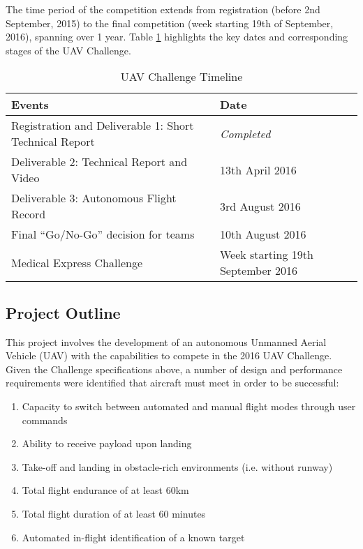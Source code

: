 The time period of the competition extends from registration (before 2nd September, 2015) to the final competition (week starting 19th of September, 2016), spanning over 1 year. Table \ref{tab:challenge} highlights the key dates and corresponding stages of the UAV Challenge.\\

\begin{table}[!ht]
	\caption{UAV Challenge Timeline}
	\label{tab:challenge}
	\centering
	\begin{tabular}{ | l | l | }
		\hline
		\textbf{Events} & \textbf{Date} \\ \hline \hline
		Registration and Deliverable 1: Short Technical Report & \textit{Completed} \\ \hline
		Deliverable 2: Technical Report and Video & 13th April 2016 \\ \hline
		Deliverable 3: Autonomous Flight Record & 3rd August 2016 \\ \hline
		Final ``Go/No-Go'' decision for teams & 10th August 2016 \\ \hline
		Medical Express Challenge & Week starting 19th September 2016 \\
		\hline
	\end{tabular}
\end{table}

\subsection{Project Outline}
This project involves the development of an autonomous Unmanned Aerial Vehicle (UAV) with the capabilities to compete in the 2016 UAV Challenge. Given the Challenge specifications above, a number of design and performance requirements were identified that aircraft must meet in order to be successful:
\begin{enumerate}[label=\bfseries R\arabic*:] \itemsep-2pt
	\item Capacity to switch between automated and manual flight modes through user commands
	\item Ability to receive payload upon landing
	\item Take-off and landing in obstacle-rich environments (i.e. without runway)
	\item Total flight endurance of at least 60km
	\item Total flight duration of at least 60 minutes
	\item Automated in-flight identification of a known target
\end{enumerate}

